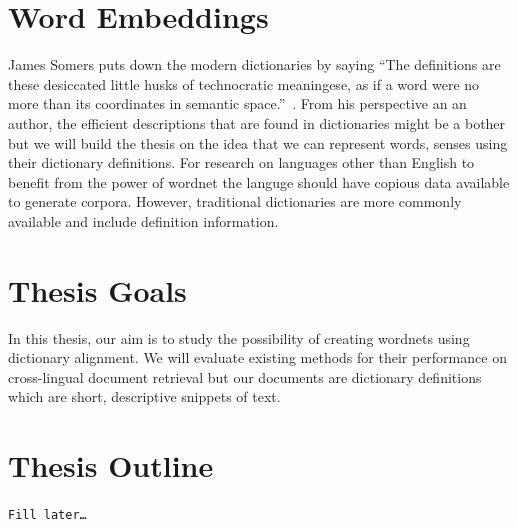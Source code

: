 \section{Word Embeddings}%
\label{sec:word_embeddings}
James Somers puts down the modern dictionaries by saying \enquote{The definitions are these desiccated little husks of technocratic meaningese, as if a word were no more than its coordinates in semantic space.}~\cite{somers_youre_2014}.
From his perspective an an author, the efficient descriptions that are found in dictionaries might be a bother but we will build the thesis on the idea that we can represent words, senses using their dictionary definitions.
For research on languages other than English to benefit from the power of wordnet the languge should have copious data available to generate corpora.
However, traditional dictionaries are more commonly available and include definition information.

\section{Thesis Goals}%
\label{sec:thesis_goals}
In this thesis, our aim is to study the possibility of creating wordnets using dictionary alignment.
We will evaluate existing methods for their performance on cross-lingual document retrieval but our documents are dictionary definitions which are short, descriptive snippets of text.

\section{Thesis Outline}%
\label{sec:thesis_outline}
\texttt{Fill later\ldots}
